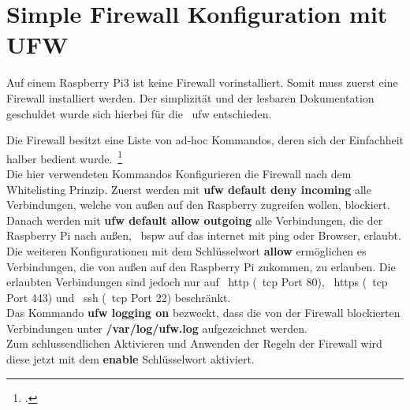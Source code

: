 
\section{Simple Firewall Konfiguration mit UFW}\label{sec:simple-firewall-konfiguration}
Auf einem Raspberry Pi3 ist keine Firewall vorinstalliert.
Somit muss zuerst eine Firewall installiert werden.
Der simplizität und der lesbaren Dokumentation geschuldet wurde sich hierbei für die ~\gls{ufw} entschieden.

Die Firewall besitzt eine Liste von ad-hoc Kommandos, deren sich der Einfachheit halber bedient wurde.~\footcite{ufw-doc} \\

Die hier verwendeten Kommandos Konfigurieren die Firewall nach dem Whitelisting Prinzip.
Zuerst werden mit \textbf{ufw default deny incoming} alle Verbindungen, welche von außen auf den Raspberry zugreifen wollen, blockiert.
Danach werden mit \textbf{ufw default allow outgoing} alle Verbindungen, die der Raspberry Pi nach außen, ~\gls{bspw} auf das internet mit ping oder Browser, erlaubt.
Die weiteren Konfigurationen mit dem Schlüsselwort \textbf{allow} ermöglichen es Verbindungen, die von außen auf den Raspberry Pi zukommen,
zu erlauben.
Die erlaubten Verbindungen sind jedoch nur auf ~\gls{http} (~\gls{tcp} Port 80), ~\gls{https} (~\gls{tcp} Port 443) und ~\gls{ssh} (~\gls{tcp} Port 22) beschränkt. \\
Das Kommando \textbf{ufw logging on} bezweckt, dass die von der Firewall blockierten Verbindungen unter \textbf{/var/log/ufw.log} aufgezeichnet werden. \\
Zum schlussendlichen Aktivieren und Anwenden der Regeln der Firewall wird diese jetzt mit dem \textbf{enable} Schlüsselwort aktiviert.
